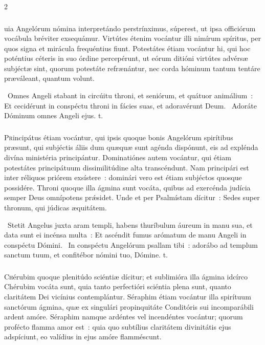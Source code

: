 \documentclass[9pt,twoside]{extarticle}
\begin{document}
\begin{multicols}{2}
{{{\subsubsection*{\center {}}
uia Angelórum nómina interpretándo perstrínximus, súperest, ut ipsa officiórum vocábula bréviter exsequámur. Virtútes étenim vocántur illi nimírum spíritus, per quos signa et mirácula frequéntius fiunt. Potestátes étiam vocántur hi, qui hoc poténtius céteris in suo órdine percepérunt, ut eórum ditióni virtútes advérsæ subjéctæ sint, quorum potestáte refrænántur, nec corda hóminum tantum tentáre præváleant, quantum volunt.

\begin{tightlist}{}
\item {}~Omnes Angeli stabant in circúitu throni, et seniórum, et quátuor animálium~: \textred{*} Et cecidérunt in conspéctu throni in fácies suas, et adoravérunt Deum. ~Adoráte Dóminum omnes Angeli ejus. t.
\end{tightlist}

\subsubsection*{\center {}}
\lettrine{P}rincipátus étiam vocántur, qui ipsis quoque bonis Angelórum spirítibus præsunt, qui subjéctis áliis dum quæquæ sunt agénda dispónunt, eis ad explénda divína ministéria principántur. Dominatiónes autem vocántur, qui étiam potestátes principátuum dissimilitúdine alta transcéndunt. Nam principári est inter réliquos priórem exsístere~: dominári vero est étiam subjéctos quosque possidére. Throni quoque illa ágmina sunt vocáta, quibus ad exercénda judícia semper Deus omnípotens prǽsidet. Unde et per Psalmístam dícitur~: Sedes super thronum, qui júdicas æquitátem.

\begin{tightlist}{}
\item {}~Stetit Angelus juxta aram templi, habens thuríbulum áureum in manu sua, et data sunt ei incénsa multa~: \textred{*} Et ascéndit fumus arómatum de manu Angeli in conspéctu Dómini. ~In conspéctu Angelórum psallam tibi~: adorábo ad templum sanctum tuum, et confitébor nómini tuo, Dómine. t.
\end{tightlist}

\subsubsection*{\center {}}
\lettrine{C}hérubim quoque plenitúdo sciéntiæ dícitur; et sublimióra illa ágmina idcírco Chérubim vocáta sunt, quia tanto perfectióri sciéntia plena sunt, quanto claritátem Dei vicínius contemplántur. Séraphim étiam vocántur illa spirítuum sanctórum ágmina, quæ ex singulári propinquitáte Conditóris sui incomparábili ardent amóre. Séraphim namque ardéntes vel incendéntes vocántur; quorum profécto flamma amor est~: quia quo subtílius claritátem divinitátis ejus adspíciunt, eo valídius in ejus amóre flamméscunt.

}}}
\end{multicols}
\end{document}
